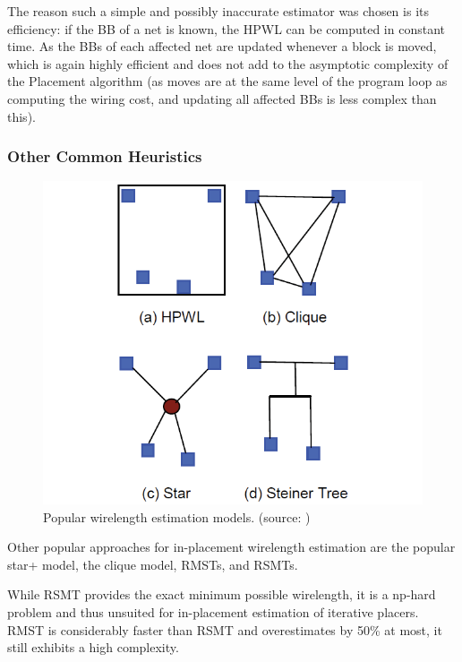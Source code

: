 The reason such a simple and possibly inaccurate estimator was chosen is its efficiency: if the \gls{BB} of a net is known, the \gls{HPWL} can be computed in constant time. As the \glspl{BB} of each affected net are updated whenever a block is moved, which is again highly efficient and does not add to the asymptotic complexity of the Placement algorithm (as moves are at the same level of the program loop as computing the wiring cost, and updating all affected \glspl{BB} is less complex than this).

\subsubsection{Other Common Heuristics}

\begin{figure}
	\includegraphics[width=\textwidth]{plots/wirelength-estimation-models.png}
	\caption{Popular wirelength estimation models. (source: \cite{star-plus-paper})}
	\label{fig:wirelength-estimation-models}
\end{figure}

Other popular approaches for in-placement wirelength estimation are the popular star+ model, the clique model, \glspl{RMST}, and \glspl{RSMT}.\cite{star-plus-paper}

While \gls{RSMT} provides the exact minimum possible wirelength, it is a np-hard problem and thus unsuited for in-placement estimation of iterative placers. \gls{RMST} is considerably faster than \gls{RSMT} and overestimates by 50\% at most\cite{rmst-quality}, it still exhibits a high complexity.


